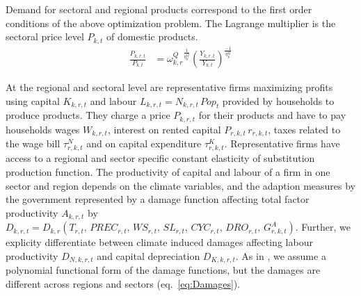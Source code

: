 \documentclass[10pt,a4paper]{article}
\begin{document}
Demand for sectoral and regional products correspond to the first order conditions of the above optimization problem. The Lagrange multiplier is the sectoral price level $P_{k,t}$ of domestic products. 
\begin{align}
\frac{P_{k,r,t}}{P_{k,t}} &= {\omega^{Q}_{k,r}}^{\frac{1}{\eta^{Q}_{k}}} \left(\frac{Y_{k,r,t}}{Y_{k,t}}\right)^{\frac{-1}{\eta^{Q}_{k}}}
\end{align}

At the regional and sectoral level are representative firms maximizing profits using capital $K_{k,r,t}$ and labour $L_{k,r,t} = N_{k,r,t} \, Pop_{t}$ provided by households to produce products. They charge a price $P_{k,r,t}$ for their products and have to pay households wages $W_{k,r,t}$, interest on rented capital $P_{r,k,t} \, r_{r,k,t}$, taxes related to the wage bill $\tau^{N}_{r,k,t}$ and on capital expenditure $\tau^{K}_{r,k,t}$.  Representative firms have access to a regional and sector specific constant elasticity of substitution production function. The productivity of capital and labour of a firm in one sector and region depends on the climate variables, and the adaption measures by the government represented by a damage function affecting total factor productivity $A_{k,r,t}$ by $D_{k,r,t} = D_{k,r}\left(T_{r,t}, \, PREC_{r,t}, \, WS_{r,t}, \, SL_{r,t}, \, CYC_{r,t}, \, DRO_{r,t}, \, G^{A}_{r,k,t} \right)$.  Further, we explicity differentiate between climate induced damages affecting labour productivity $D_{N,k,r,t}$ and capital depreciation $D_{K,k,r,t}$. As in \cite{nordhaus1993optimal}, we assume a polynomial functional form of the damage functions, but the damages are different across regions and sectors (eq.~\ref{eq:Damages}).
\end{document}
